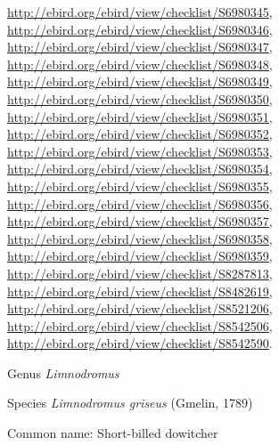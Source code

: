 \documentclass[9pt, article]{memoir}
\begin{document}
\begin{multicols}{2}
\url{http://ebird.org/ebird/view/checklist/S6980345}, 
\url{http://ebird.org/ebird/view/checklist/S6980346}, 
\url{http://ebird.org/ebird/view/checklist/S6980347}, 
\url{http://ebird.org/ebird/view/checklist/S6980348}, 
\url{http://ebird.org/ebird/view/checklist/S6980349}, 
\url{http://ebird.org/ebird/view/checklist/S6980350}, 
\url{http://ebird.org/ebird/view/checklist/S6980351}, 
\url{http://ebird.org/ebird/view/checklist/S6980352}, 
\url{http://ebird.org/ebird/view/checklist/S6980353}, 
\url{http://ebird.org/ebird/view/checklist/S6980354}, 
\url{http://ebird.org/ebird/view/checklist/S6980355}, 
\url{http://ebird.org/ebird/view/checklist/S6980356}, 
\url{http://ebird.org/ebird/view/checklist/S6980357}, 
\url{http://ebird.org/ebird/view/checklist/S6980358}, 
\url{http://ebird.org/ebird/view/checklist/S6980359}, 
\url{http://ebird.org/ebird/view/checklist/S8287813}, 
\url{http://ebird.org/ebird/view/checklist/S8482619}, 
\url{http://ebird.org/ebird/view/checklist/S8521206}, 
\url{http://ebird.org/ebird/view/checklist/S8542506}, 
\url{http://ebird.org/ebird/view/checklist/S8542590}.

\vspace{6pt}\noindent\hspace{30pt}Genus \textit{Limnodromus}


\vspace{6pt}\noindent\hspace{36pt}Species \textit{Limnodromus griseus} (Gmelin, 1789)


Common name: Short-billed dowitcher


\end{multicols}
\end{document}
